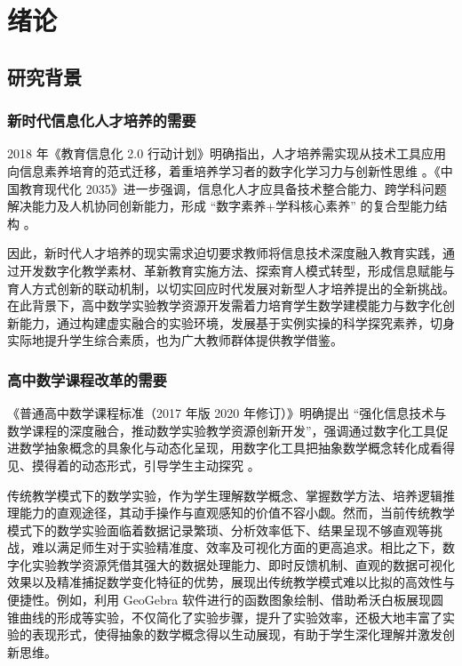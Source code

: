 
\chapter{绪论}

\section{研究背景}

\subsection{新时代信息化人才培养的需要}

2018 年《教育信息化 2.0 行动计划》明确指出，人才培养需实现从技术工具应用向信息素养培育的范式迁移，着重培养学习者的数字化学习力与创新性思维 \cite{2018_教育部_教育部} 。《中国教育现代化 2035》进一步强调，信息化人才应具备技术整合能力、跨学科问题解决能力及人机协同创新能力，形成 “数字素养+学科核心素养” 的复合型能力结构 \cite{2019_中共中央_国务院_中国教育现代化2035}。

因此，新时代人才培养的现实需求迫切要求教师将信息技术深度融入教育实践，通过开发数字化教学素材、革新教育实施方法、探索育人模式转型，形成信息赋能与育人方式创新的联动机制，以切实回应时代发展对新型人才培养提出的全新挑战。在此背景下，高中数学实验教学资源开发需着力培育学生数学建模能力与数字化创新能力，通过构建虚实融合的实验环境，发展基于实例实操的科学探究素养，切身实际地提升学生综合素质，也为广大教师群体提供教学借鉴。

\subsection{高中数学课程改革的需要}

《普通高中数学课程标准（2017 年版 2020 年修订）》明确提出 “强化信息技术与数学课程的深度融合，推动数学实验教学资源创新开发”，强调通过数字化工具促进数学抽象概念的具象化与动态化呈现，用数字化工具把抽象数学概念转化成看得见、摸得着的动态形式，引导学生主动探究 \cite{2020_中华人民共和国教育部_普通高中数学课程标准}。

传统教学模式下的数学实验，作为学生理解数学概念、掌握数学方法、培养逻辑推理能力的直观途径，其动手操作与直观感知的价值不容小觑。然而，当前传统教学模式下的数学实验面临着数据记录繁琐、分析效率低下、结果呈现不够直观等挑战，难以满足师生对于实验精准度、效率及可视化方面的更高追求。相比之下，数字化实验教学资源凭借其强大的数据处理能力、即时反馈机制、直观的数据可视化效果以及精准捕捉数学变化特征的优势，展现出传统教学模式难以比拟的高效性与便捷性。例如，利用 GeoGebra 软件进行的函数图象绘制、借助希沃白板展现圆锥曲线的形成等实验，不仅简化了实验步骤，提升了实验效率，还极大地丰富了实验的表现形式，使得抽象的数学概念得以生动展现，有助于学生深化理解并激发创新思维。

